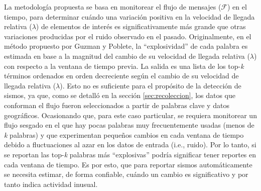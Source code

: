 \begin{figure}
	\centering
	\vspace{-30px}
	\par\medskip
\end{figure}

La metodología propuesta se basa en monitorear el flujo de mensajes ($\mathcal{F}$) en el tiempo, para determinar cuándo una variación positiva en la velocidad de llegada relativa ($\lambda$) de elementos de interés es significativamente más grande que otras variaciones producidas por el ruido observado en el pasado.
%
Originalmente, en el método propuesto por Guzman y Poblete, la ``explosividad'' de cada palabra es estimada en base a la magnitud del cambio de su velocidad de llegada relativa ($\lambda$) con respecto a la ventana de tiempo previa.
%
La salida es una lista de los top-\emph{k} términos ordenados en orden decreciente según el cambio de su velocidad de llegada relativa ($\lambda$).
%
Esto no es suficiente para el propósito de la detección de sismos, ya que, como se detalló en la sección \ref{sec:recoleccion}, los datos que conforman el flujo fueron seleccionados a partir de palabras clave y datos geográficos. 
%
Ocasionando que, para este caso particular, se requiera monitorear un flujo sesgado en el que hay pocas palabras muy frecuentemente usadas (menos de \emph{k} palabras) y que experimentan pequeños cambios en cada ventana de tiempo debido a fluctuaciones al azar en los datos de entrada (i.e., ruido).
%
Por lo tanto, si se reportan las top-\emph{k} palabras más ``explosivas'' podría significar tener reportes en cada ventana de tiempo.
%
Es por esto, que para reportar sismos automáticamente se necesita estimar, de forma confiable, cuándo un cambio es significativo y por tanto indica actividad inusual.


